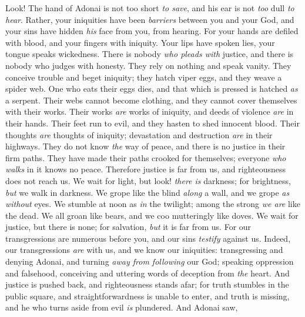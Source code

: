 \begin{biblechapter} %
 Look! The hand of Adonai is not too short \textit{to save}, 
and his ear is not \textit{too} dull \textit{to hear}.
\verse Rather, your iniquities have been \textit{barriers} between you and your God, 
and your sins have hidden \textit{his} face from you, from hearing.
\verse For your hands are defiled with blood, 
and your fingers with iniquity. 
Your lips have spoken lies, 
your tongue speaks wickedness.
\verse There is nobody \textit{who pleads with} justice, 
and there is nobody who judges with honesty. 
They rely on nothing 
and speak vanity. 
They conceive trouble 
and beget iniquity;
\verse they hatch viper eggs, 
and they weave a spider web. 
One who eats their eggs dies, 
and that which is pressed is hatched \textit{as} a serpent.
\verse Their webs cannot become clothing, 
and they cannot cover themselves with their works. 
Their works \textit{are} works of iniquity, 
and deeds of violence \textit{are} in their hands.
\verse Their feet run to evil, 
and they hasten to shed innocent blood. 
Their thoughts \textit{are} thoughts of iniquity; 
devastation and destruction \textit{are} in their highways.
\verse They do not know \textit{the} way of peace, 
and there is no justice in their firm paths. 
They have made their paths crooked for themselves; 
everyone \textit{who walks} in it knows no peace.
\verse Therefore justice is far from us, 
and righteousness does not reach us. 
We wait for light, but look! \textit{there is} darkness; 
for brightness, \textit{but} we walk in darkness.
\verse We grope like the blind \textit{along} a wall, 
and we grope \textit{as without} eyes. 
We stumble at noon as \textit{in} the twilight; 
among the strong \textit{we are} like the dead.
\verse We all groan like bears, 
and we coo mutteringly like doves. 
We wait for justice, but there is none; 
for salvation, \textit{but} it is far from us.
\verse For our transgressions are numerous before you, 
and our sins \textit{testify} against us. 
Indeed, our transgressions \textit{are} with us, 
and we know our iniquities:
\verse transgressing and denying Adonai, 
and turning \textit{away from following} our God; 
speaking oppression and falsehood, 
conceiving and uttering words of deception from \textit{the} heart.
\verse And justice is pushed back, 
and righteousness stands afar; 
for truth stumbles in the public square, 
and straightforwardness is unable to enter,
\verse and truth is missing, 
and he who turns aside from evil \textit{is} plundered. 
And Adonai saw, 

\end{biblechapter}
